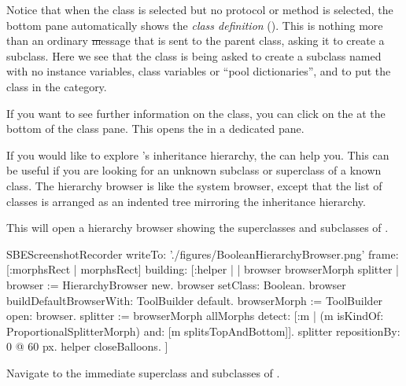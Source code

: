 \documentclass[a4paper,10pt,twoside]{book}
\begin{document}
Notice that when the  class is selected but no protocol or method is selected, the bottom pane automatically shows the \emph{class definition}
().
This is nothing more than an ordinary \st message that is sent to the parent class, asking it to create a subclass.
Here we see that the class  is being asked to create a subclass named  with no instance variables, class variables or ``pool dictionaries'', and to put the class  in the  category.

If you want to see further information on the class, you can click on the  at the bottom of the class pane.
This opens the  in a dedicated pane.

If you would like to explore \sq's inheritance hierarchy, the  can help you.
This can be useful if you are looking for an unknown subclass or superclass of a known class.
The hierarchy browser is like the system browser, except that the list of classes is arranged as an indented tree mirroring the inheritance hierarchy.

\noindent
This will open a hierarchy browser showing the superclasses and subclasses of .

\begin{ExecuteSmalltalkScript}
SBEScreenshotRecorder writeTo: './figures/BooleanHierarchyBrowser.png' frame: [:morphsRect | morphsRect] building: [:helper | | browser browserMorph splitter |
	browser := HierarchyBrowser new.
	browser setClass: Boolean.
	browser buildDefaultBrowserWith: ToolBuilder default.
	browserMorph := ToolBuilder open: browser.
	splitter := browserMorph allMorphs detect: [:m |
		(m isKindOf: ProportionalSplitterMorph) and: [m splitsTopAndBottom]].
	splitter repositionBy: 0 @ 60 px.
	helper closeBalloons.
]
\end{ExecuteSmalltalkScript}

Navigate to the immediate superclass and subclasses of .
\end{document}
